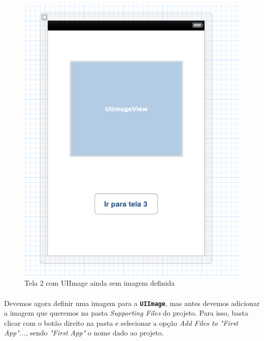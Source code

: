 \documentclass[a4paper,12pt,brazil,doubleside]{book}
\begin{document}
\begin{figure}[h]
  \centering
  \includegraphics[totalheight=0.35\textheight]{figuras/2/xib_tela2.png}
  \caption{Tela 2 com UIImage ainda sem imagem definida}
  \label{fig:a}
\end{figure}

\paragraph{}Devemos agora definir uma imagem para a \texttt{\textbf{UIImage}}, mas antes devemos adicionar a imagem que queremos na pasta \emph{Supporting Files} do projeto. Para isso, basta clicar com o botão direito na pasta e selecionar a opção \emph{Add Files to "First App"...}, sendo \emph{"First App"} o nome dado ao projeto.
\end{document}
